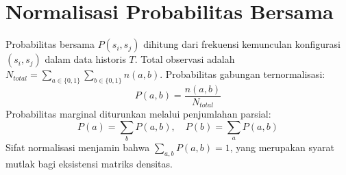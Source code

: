\section{Normalisasi Probabilitas Bersama}
Probabilitas bersama $P(s_i, s_j)$ dihitung dari frekuensi kemunculan konfigurasi $(s_i, s_j)$ dalam data historis $T$.
Total observasi adalah $N_{total} = \sum_{a \in \{0, 1\}} \sum_{b \in \{0, 1\}} n(a, b)$.
Probabilitas gabungan ternormalisasi:
\begin{equation}
P(a, b) = \frac{n(a, b)}{N_{total}}
\label{eq:joint_prob_norm}
\end{equation}
Probabilitas marginal diturunkan melalui penjumlahan parsial:
\begin{equation}
P(a) = \sum_{b} P(a, b), \quad P(b) = \sum_{a} P(a, b)
\label{eq:marginal_prob_norm}
\end{equation}
Sifat normalisasi menjamin bahwa $\sum_{a,b} P(a,b) = 1$, yang merupakan syarat mutlak bagi eksistensi matriks densitas.
